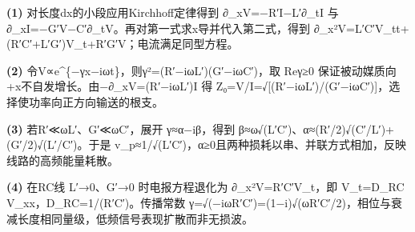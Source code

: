\par\noindent\textbf{(1)} 对长度dx的小段应用Kirchhoff定律得到 ∂\_xV=−R′I−L′∂\_tI 与 ∂\_xI=−G′V−C′∂\_tV。再对第一式求x导并代入第二式，得到 ∂\_x²V=L′C′V\_tt+(R′C′+L′G′)V\_t+R′G′V；电流满足同型方程。
\par\noindent\textbf{(2)} 令V∝e\textasciicircum{}\{−γx−iωt\}，则γ²=(R′−iωL′)(G′−iωC′)，取 Reγ≥0 保证被动媒质向+x不自发增长。由−∂\_xV=(R′−iωL′)I 得 Z₀=V/I=√[(R′−iωL′)/(G′−iωC′)]，选择使功率向正方向输送的根支。
\par\noindent\textbf{(3)} 若R′≪ωL′、G′≪ωC′，展开 γ≈α−iβ，得到 β≈ω√(L′C′)、α≈(R′/2)√(C′/L′)+(G′/2)√(L′/C′)。于是 v\_p≈1/√(L′C′)，α≥0且两种损耗以串、并联方式相加，反映线路的高频能量耗散。
\par\noindent\textbf{(4)} 在RC线 L′→0、G′→0 时电报方程退化为 ∂\_x²V=R′C′V\_t，即 V\_t=D\_RC V\_xx，D\_RC=1/(R′C′)。传播常数 γ=√(−iωR′C′)=(1−i)√(ωR′C′/2)，相位与衰减长度相同量级，低频信号表现扩散而非无损波。
